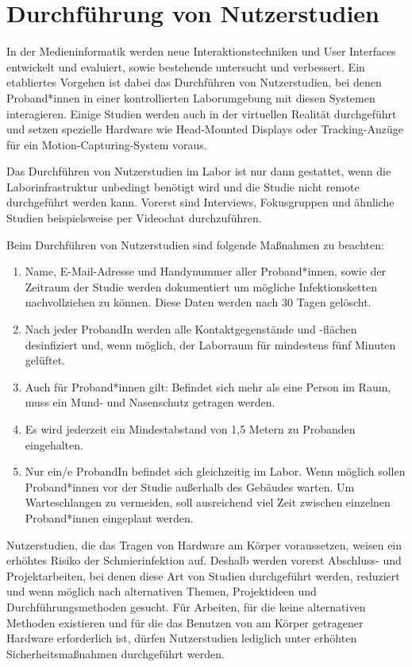 \section{Durchführung von Nutzerstudien}\label{sec:nutzerstudien}

\noindent
In der Medieninformatik werden neue Interaktionstechniken und User Interfaces entwickelt und evaluiert, sowie bestehende untersucht und verbessert.
Ein etabliertes Vorgehen ist dabei das Durchführen von Nutzerstudien, bei denen Proband*innen in einer kontrollierten Laborumgebung mit diesen Systemen interagieren.
Einige Studien werden auch in der virtuellen Realität durchgeführt und setzen spezielle Hardware wie Head-Mounted Displays oder Tracking-Anzüge für ein Motion-Capturing-System voraus.

\medskip
\noindent
Das Durchführen von Nutzerstudien im Labor ist nur dann gestattet, wenn die Laborinfrastruktur unbedingt benötigt wird und die Studie nicht remote durchgeführt werden kann.
Vorerst sind Interviews, Fokusgruppen und ähnliche Studien beispielsweise per Videochat durchzuführen.

\noindent
Beim Durchführen von Nutzerstudien sind folgende Maßnahmen zu beachten:

\begin{enumerate}
    \item Name, E-Mail-Adresse und Handynummer aller Proband*innen, sowie der Zeitraum der Studie werden dokumentiert um mögliche Infektionsketten nachvollziehen zu können. Diese Daten werden nach 30 Tagen gelöscht.
    \item Nach jeder ProbandIn werden alle Kontaktgegenstände und -flächen desinfiziert und, wenn möglich, der Laborraum für mindestens fünf Minuten gelüftet.
    \item Auch für Proband*innen gilt: Befindet sich mehr als eine Person im Raum, muss ein Mund- und Nasenschutz getragen werden.
    \item Es wird jederzeit ein Mindestabstand von 1,5 Metern zu Probanden eingehalten.
    \item Nur ein/e ProbandIn befindet sich gleichzeitig im Labor. Wenn möglich sollen Proband*innen vor der Studie außerhalb des Gebäudes warten. Um Warteschlangen zu vermeiden, soll ausreichend viel Zeit zwischen einzelnen Proband*innen eingeplant werden.
\end{enumerate}

\noindent
Nutzerstudien, die das Tragen von Hardware am Körper voraussetzen, weisen ein erhöhtes Risiko der Schmierinfektion auf.
Deshalb werden vorerst Abschluss- und Projektarbeiten, bei denen diese Art von Studien durchgeführt werden, reduziert und wenn möglich nach alternativen Themen, Projektideen und Durchführungsmethoden gesucht. Für Arbeiten, für die keine alternativen Methoden existieren und für die das Benutzen von am Körper getragener Hardware erforderlich ist, dürfen Nutzerstudien lediglich unter erhöhten Sicherheitsmaßnahmen durchgeführt werden.

